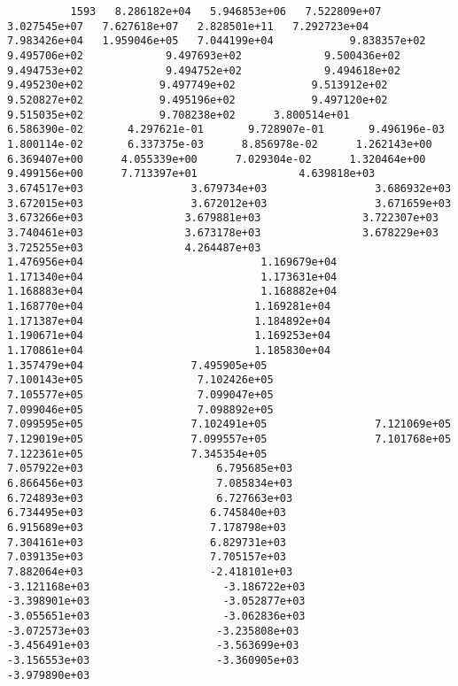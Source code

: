 \documentclass{article}
\begin{document}
{\tiny 
\begin{verbatim}
          1593   8.286182e+04   5.946853e+06   7.522809e+07   3.027545e+07   7.627618e+07   2.828501e+11   7.292723e+04   7.983426e+04   1.959046e+05   7.044199e+04            9.838357e+02             9.495706e+02             9.497693e+02             9.500436e+02             9.494753e+02             9.494752e+02             9.494618e+02            9.495230e+02            9.497749e+02            9.513912e+02            9.520827e+02            9.495196e+02            9.497120e+02            9.515035e+02            9.708238e+02      3.800514e+01       6.586390e-02       4.297621e-01       9.728907e-01       9.496196e-03       1.800114e-02       6.337375e-03      8.856978e-02      1.262143e+00      6.369407e+00      4.055339e+00      7.029304e-02      1.320464e+00      9.499156e+00      7.713397e+01                4.639818e+03                 3.674517e+03                 3.679734e+03                 3.686932e+03                 3.672015e+03                 3.672012e+03                 3.671659e+03                3.673266e+03                3.679881e+03                3.722307e+03                3.740461e+03                3.673178e+03                3.678229e+03                3.725255e+03                4.264487e+03                           1.476956e+04                            1.169679e+04                            1.171340e+04                            1.173631e+04                            1.168883e+04                            1.168882e+04                            1.168770e+04                           1.169281e+04                           1.171387e+04                           1.184892e+04                           1.190671e+04                           1.169253e+04                           1.170861e+04                           1.185830e+04                           1.357479e+04                 7.495905e+05                  7.100143e+05                  7.102426e+05                  7.105577e+05                  7.099047e+05                  7.099046e+05                  7.098892e+05                 7.099595e+05                 7.102491e+05                 7.121069e+05                 7.129019e+05                 7.099557e+05                 7.101768e+05                 7.122361e+05                 7.345354e+05                    7.057922e+03                     6.795685e+03                     6.866456e+03                     7.085834e+03                     6.724893e+03                     6.727663e+03                     6.734495e+03                    6.745840e+03                    6.915689e+03                    7.178798e+03                    7.304161e+03                    6.829731e+03                    7.039135e+03                    7.705157e+03                    7.882064e+03                    -2.418101e+03                     -3.121168e+03                     -3.186722e+03                     -3.398901e+03                     -3.052877e+03                     -3.055651e+03                     -3.062836e+03                    -3.072573e+03                    -3.235808e+03                    -3.456491e+03                    -3.563699e+03                    -3.156553e+03                    -3.360905e+03                    -3.979890e+03                    
\end{verbatim}}
\end{document}

